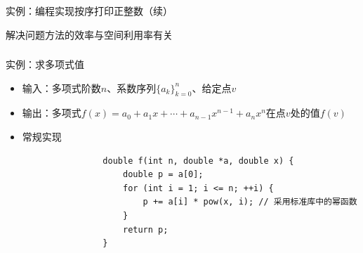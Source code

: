 \begin{fragile}
    \frametitle{\insertsubsectionhead}
    \begin{exampleblock}{实例：编程实现按序打印正整数（续）}
        \vspace{2ex}
    \end{exampleblock}
\end{fragile}

\begin{standout}[\insertsubsectionhead]
    解决问题方法的效率与\alert{空间利用率}有关
\end{standout}

\begin{fragile}
    \frametitle{\insertsubsectionhead}
    \begin{exampleblock}{实例：求多项式值}
        \begin{itemize}
            \item 输入：多项式阶数$n$、系数序列$\{a_{k}\}_{k=0}^{n}$、给定点$v$
            \item 输出：多项式$f(x) = a_{0} + a_{1}x + \cdots + a_{n-1}x^{n-1} + a_{n}x^{n}$在点$v$处的值$f(v)$
            \item<2-> 常规实现
                \begin{verbatim}
                double f(int n, double *a, double x) {
                    double p = a[0];
                    for (int i = 1; i <= n; ++i) {
                        p += a[i] * pow(x, i); // 采用标准库中的幂函数
                    }
                    return p;
                }
            \end{verbatim}
        \end{itemize}
    \end{exampleblock}
\end{fragile}

